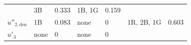 \begin{longtable}[]{@{}lllllll@{}}
\begin{minipage}[t]{0.15\columnwidth}
\end{minipage} & \begin{minipage}[t]{0.06\columnwidth}\raggedright
3B\strut
\end{minipage} & \begin{minipage}[t]{0.15\columnwidth}\raggedright
0.333\strut
\end{minipage} & \begin{minipage}[t]{0.07\columnwidth}\raggedright
1B, 1G\strut
\end{minipage} & \begin{minipage}[t]{0.15\columnwidth}\raggedright
0.159\strut
\end{minipage}\tabularnewline
\begin{minipage}[t]{0.13\columnwidth}\raggedright
\(u''_{2,\text{den}}\)\strut
\end{minipage} & \begin{minipage}[t]{0.10\columnwidth}\raggedright
1B\strut
\end{minipage} & \begin{minipage}[t]{0.15\columnwidth}\raggedright
0.083\strut
\end{minipage} & \begin{minipage}[t]{0.06\columnwidth}\raggedright
none\strut
\end{minipage} & \begin{minipage}[t]{0.15\columnwidth}\raggedright
0\strut
\end{minipage} & \begin{minipage}[t]{0.07\columnwidth}\raggedright
1R, 2B, 1G\strut
\end{minipage} & \begin{minipage}[t]{0.15\columnwidth}\raggedright
0.603\strut
\end{minipage}\tabularnewline
\begin{minipage}[t]{0.13\columnwidth}\raggedright
\(u'_3\)\strut
\end{minipage} & \begin{minipage}[t]{0.10\columnwidth}\raggedright
none\strut
\end{minipage} & \begin{minipage}[t]{0.15\columnwidth}\raggedright
0\strut
\end{minipage} & \begin{minipage}[t]{0.06\columnwidth}\raggedright
none\strut
\end{minipage} & \begin{minipage}[t]{0.15\columnwidth}\raggedright
0\strut
\end{minipage} & \begin{minipage}[t]{0.07\columnwidth}\raggedright

\end{minipage}
\end{longtable}
